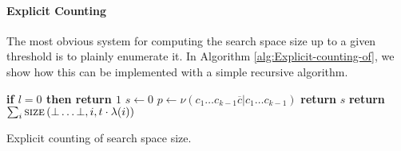 \documentclass[a4paper,twocolumn]{article}
\newenvironment{lyxcode}
{\par\begin{list}{}{
\setlength{\rightmargin}{\leftmargin}
\setlength{\listparindent}{0pt}\raggedright
\setlength{\itemsep}{0pt}
\setlength{\parsep}{0pt}
\normalfont\ttfamily}\item[]}
{\end{list}}
\begin{document}
\paragraph*{Explicit Counting}

The most obvious system for computing the search space size up to
a given threshold is to plainly enumerate it. In Algorithm \ref{alg:Explicit-counting-of},
we show how this can be implemented with a simple recursive algorithm.

\begin{algorithm}
\begin{algorithmic}
\State {}
\State \textbf{if $l=0$ then return $1$}
\State $s\gets 0$
\State $p\gets \nu\left(\left.c_1\ldots c_{k-1} \overline c \right| c_1\ldots c_{k-1}\right)$
\EndIf
\EndFor
\State \textbf{return} $s$
\EndFunction
\State
{} 
\State \textbf{return} $\sum_i  \textsc{size}\left(\bot\ldots\bot, i, t \cdot \lambda(i)\right)$
\EndFunction
\end{algorithmic}

\textbf{}\begin{comment}
\begin{lyxcode}
\textbf{def}~space~size(state,~length,~threshold):

~~~~\textbf{if}~length~==~0:

~~~~~~~~\textbf{return}~1

~~~~s~=~0

~~~~\textbf{for}~c~\textbf{in}~chars:

~~~~~~~~p~=~\emph{nu}(state~+~c,~state)

~~~~~~~~\textbf{if}~p~>=~threshold:

~~~~~~~~~~~~s~+=~spacesize(state{[}1:{]}~+~c,

~~~~~~~~~~~~~~~~~~~~~~~~~~~length~-~1,

~~~~~~~~~~~~~~~~~~~~~~~~~~~threshold~{*}~p)

~~~~\textbf{return}~s
\end{lyxcode}

\end{comment}
{}

\caption{\label{alg:Explicit-counting-of}Explicit counting of search space
size.}



\end{algorithm}
\end{document}
